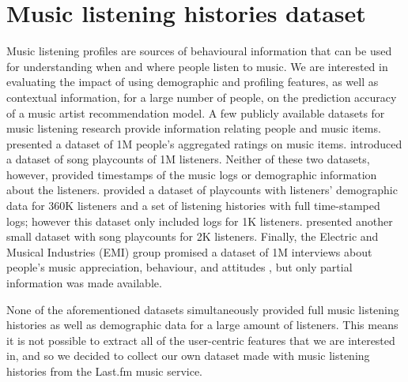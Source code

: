 


\chapter{Music listening histories dataset}\label{ch:5-music-listening-histories-dataset}
\graphicspath{{./figs/ch7/} }
Music listening profiles are sources of behavioural information that can be used for understanding when and where people listen to music. 
We are interested in evaluating the impact of using demographic and profiling features, as well as contextual information, for a large number of people, on the prediction accuracy of a music artist recommendation model. A few publicly available datasets for music listening research provide information relating people and music items. \textcite{dror11yahoo} presented a dataset of 1M people's aggregated ratings on music items. \textcite{mcfee12million} introduced a dataset of song playcounts of 1M listeners. Neither of these two datasets, however, provided timestamps of the music logs or demographic information about the listeners. \textcite{celma10music} provided a dataset of playcounts with listeners' demographic data for 360K listeners and a set of listening histories with full time-stamped logs; however this dataset only included logs for 1K listeners. \textcite{cantador11workshop} presented another small dataset with song playcounts for 2K listeners.
Finally, the Electric and Musical Industries (EMI) group promised a dataset of 1M interviews about people's music appreciation, behaviour, and attitudes \autocite{emi12million}, but only partial information was made available.

None of the aforementioned datasets simultaneously provided full music listening histories as well as demographic data for a large amount of listeners. 
This means it is not possible to extract all of the user-centric features that we are interested in, and so we decided to collect our own dataset made with music listening histories from the Last.fm music service.



